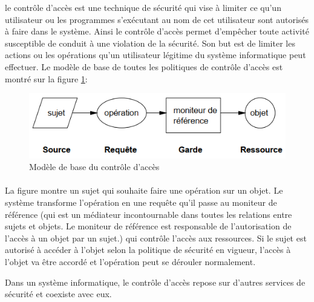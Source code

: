 le contrôle d'accès est une technique de sécurité qui vise à limiter ce qu'un utilisateur ou les programmes s'exécutant au nom de cet utilisateur sont autorisés à faire dans le système. Ainsi le contrôle d'accès permet d'empêcher toute activité susceptible de conduit à une violation de la sécurité. Son but est de limiter les actions ou les opérations qu'un utilisateur légitime du système informatique peut effectuer. Le modèle de base de toutes les politiques de contrôle d'accès est montré sur la figure \ref{figAc}:
\begin{figure}[h!]
    \centering
		\includegraphics[scale=0.7]{chap1/images/Ac.png}
    \caption{Modèle de base du contrôle d'accès}
	 \label{figAc}
\end{figure}

\paragraph{} La figure montre un sujet qui souhaite faire une opération sur un objet. Le système transforme l'opération en une requête qu'il passe au moniteur de référence (qui est un médiateur incontournable dans toutes les relations entre sujets et objets. Le moniteur de référence est responsable de l'autorisation de l'accès à un objet par un sujet.) qui contrôle l'accès aux ressources. Si le sujet est autorisé à accéder à l'objet selon la politique de sécurité en vigueur, l'accès à l'objet va être accordé et l'opération peut se dérouler normalement.

\label{sectionAccès}
 Dans un système informatique, le contrôle d'accès repose sur d'autres services de sécurité et coexiste avec eux. 

